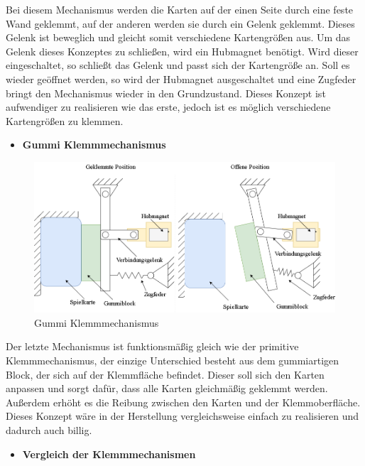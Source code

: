 Bei diesem Mechanismus werden die Karten auf der einen Seite durch eine feste Wand geklemmt, auf der anderen werden sie durch ein Gelenk geklemmt.
Dieses Gelenk ist beweglich und gleicht somit verschiedene Kartengrößen aus.
Um das Gelenk dieses Konzeptes zu schließen, wird ein Hubmagnet benötigt.
Wird dieser eingeschaltet, so schließt das Gelenk und passt sich der Kartengröße an.
Soll es wieder geöffnet werden, so wird der Hubmagnet ausgeschaltet und eine Zugfeder bringt den Mechanismus wieder in den Grundzustand.
Dieses Konzept ist aufwendiger zu realisieren wie das erste, jedoch ist es möglich verschiedene Kartengrößen zu klemmen.

\begin{itemize}
    \item \textbf{Gummi Klemmmechanismus}
\end{itemize}

\begin{figure}[H]
    \centering
    \includegraphics[scale=0.45,page=1]{fig/mech/Klemmmechanissmus-Page-3.png}
    \caption{Gummi Klemmmechanismus}
\end{figure}

Der letzte Mechanismus ist funktionsmäßig gleich wie der primitive Klemmmechanismus, der einzige Unterschied besteht aus dem
gummiartigen Block, der sich auf der Klemmfläche befindet.
Dieser soll sich den Karten anpassen und sorgt dafür, dass alle Karten gleichmäßig geklemmt werden.
Außerdem erhöht es die Reibung zwischen den Karten und der Klemmoberfläche.
Dieses Konzept wäre in der Herstellung vergleichsweise einfach zu realisieren und dadurch auch billig.


\begin{itemize}
    \item \textbf{Vergleich der Klemmmechanismen}
\end{itemize}

